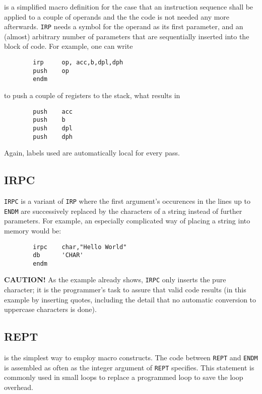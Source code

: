 \documentclass[12pt,twoside]{report}
\makeatletter
\newcommand{\bb}[1]{{\bf #1}}
\newcommand{\tty}[1]{{\tt #1}}
\newcommand{\ttindex}[1]{\index{#1@{\tt #1}}}
\makeatother
\begin{document}
is a simplified macro definition for the case that an instruction sequence
shall be applied to a couple of operands and the the code is not needed
any more afterwards.  \tty{IRP} needs a symbol for the operand as its
first parameter, and an (almost) arbitrary number of parameters that are
sequentially inserted into the block of code.  For example, one can write
\begin{verbatim}
        irp     op, acc,b,dpl,dph
        push    op
        endm
\end{verbatim}
to push a couple of registers to the stack, what results in
\begin{verbatim}
        push    acc
        push    b  
        push    dpl
        push    dph
\end{verbatim}
Again, labels used are automatically local for every pass.


\subsection{IRPC}
\ttindex{IRPC}   

\tty{IRPC} is a variant of \tty{IRP} where the first argument's occurences
in the lines up to \tty{ENDM} are successively replaced by the characters
of a string instead of further parameters.  For example, an especially
complicated way of placing a string into memory would be:
\begin{verbatim}
        irpc    char,"Hello World"
        db      'CHAR'
        endm
\end{verbatim}
\bb{CAUTION!} As the example already shows, \tty{IRPC} only inserts the
pure character; it is the programmer's task to assure that valid code
results (in this example by inserting quotes, including the detail that no
automatic conversion to uppercase characters is done).


\subsection{REPT}
\ttindex{REPT}

is the simplest way to employ macro constructs.  The code between
\tty{REPT} and \tty{ENDM} is assembled as often as the integer argument of
\tty{REPT} specifies.  This statement is commonly used in small loops to
replace a programmed loop to save the loop overhead.
\end{document}
